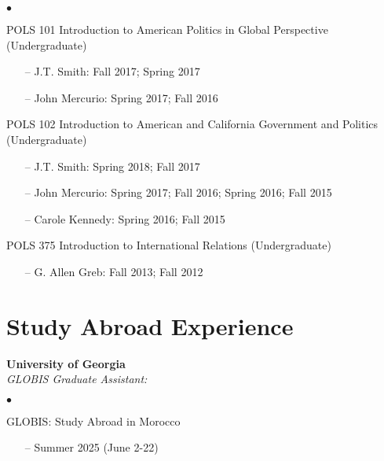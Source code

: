 \documentclass[letterpaper,12pt]{article}
\newenvironment{list2}{
  \begin{list}{$\bullet$}{%
      \setlength{\itemsep}{0in}
      \setlength{\parsep}{0in} 
      \setlength{\parskip}{0in}
      \setlength{\topsep}{0in} 
      \setlength{\partopsep}{0in}
      \setlength{\leftmargin}{1in}
      \setlength{\labelsep}{1em}
      \setlength{\labelwidth}{1em}
      \setlength{\itemindent}{-2em}
      \setlength{\listparindent}{2em}}}{\end{list}}
\begin{document}
\begin{list2}
    \item POLS 101 Introduction to American Politics in Global Perspective (Undergraduate)
        \begin{enumerate}[leftmargin=!,labelindent=0pt,itemindent=-15pt]
            \item[--] J.T. Smith: Fall 2017; Spring 2017
            \item[--] John Mercurio: Spring 2017; Fall 2016
        \end{enumerate}
    \item POLS 102 Introduction to American and California Government and Politics (Undergraduate)
        \begin{enumerate}[leftmargin=!,labelindent=0pt,itemindent=-15pt]
            \item[--] J.T. Smith: Spring 2018; Fall 2017
            \item[--] John Mercurio: Spring 2017; Fall 2016; Spring 2016; Fall 2015
            \item[--] Carole Kennedy: Spring 2016; Fall 2015
        \end{enumerate}
    \item POLS 375 Introduction to International Relations (Undergraduate)
        \begin{enumerate}[leftmargin=!,labelindent=0pt,itemindent=-15pt]
            \item[--] G. Allen Greb: Fall 2013; Fall 2012
        \end{enumerate}
\end{list2}

\section{Study Abroad Experience}
\textbf{University of Georgia}\\
\textit{GLOBIS Graduate Assistant:}
\begin{list2}
    \item GLOBIS: Study Abroad in Morocco
            \begin{enumerate}[leftmargin=!,labelindent=0pt,itemindent=-15pt]
                \item[--] Summer 2025 (June 2-22)
            \end{enumerate}
\end{list2}
\par
\end{document}

